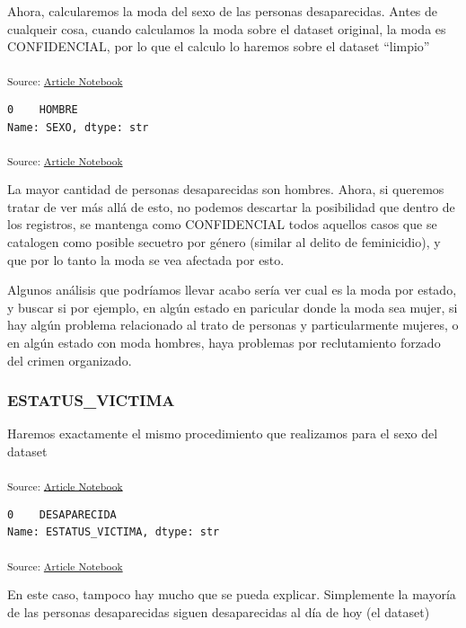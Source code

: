 \documentclass[
]{agujournal2019}
\begin{document}
Ahora, calcularemos la moda del sexo de las personas desaparecidas.
Antes de cualqueir cosa, cuando calculamos la moda sobre el dataset
original, la moda es CONFIDENCIAL, por lo que el calculo lo haremos
sobre el dataset ``limpio''

\textsubscript{Source:
\href{https://Rou-uu.github.io/pruebaQuarto/index.qmd.html}{Article
Notebook}}

\begin{verbatim}
0    HOMBRE
Name: SEXO, dtype: str
\end{verbatim}

\textsubscript{Source:
\href{https://Rou-uu.github.io/pruebaQuarto/index.qmd.html}{Article
Notebook}}

La mayor cantidad de personas desaparecidas son hombres. Ahora, si
queremos tratar de ver más allá de esto, no podemos descartar la
posibilidad que dentro de los registros, se mantenga como CONFIDENCIAL
todos aquellos casos que se catalogen como posible secuetro por género
(similar al delito de feminicidio), y que por lo tanto la moda se vea
afectada por esto.

Algunos análisis que podríamos llevar acabo sería ver cual es la moda
por estado, y buscar si por ejemplo, en algún estado en paricular donde
la moda sea mujer, si hay algún problema relacionado al trato de
personas y particularmente mujeres, o en algún estado con moda hombres,
haya problemas por reclutamiento forzado del crimen organizado.

\subsubsection{ESTATUS\_VICTIMA}\label{estatus_victima}

Haremos exactamente el mismo procedimiento que realizamos para el sexo
del dataset

\textsubscript{Source:
\href{https://Rou-uu.github.io/pruebaQuarto/index.qmd.html}{Article
Notebook}}

\begin{verbatim}
0    DESAPARECIDA
Name: ESTATUS_VICTIMA, dtype: str
\end{verbatim}

\textsubscript{Source:
\href{https://Rou-uu.github.io/pruebaQuarto/index.qmd.html}{Article
Notebook}}

En este caso, tampoco hay mucho que se pueda explicar. Simplemente la
mayoría de las personas desaparecidas siguen desaparecidas al día de hoy
(el dataset)
\end{document}
